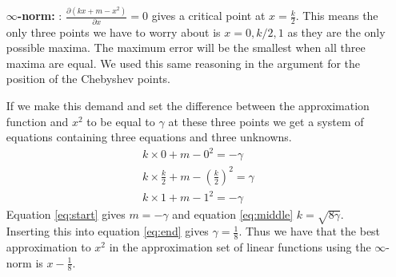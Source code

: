 \begin{solution}
\begin{enumerate}
  \item [{\bf $\infty$-norm: }]:
    $\frac{\partial (kx + m - x^2)}{\partial x} = 0$ gives a critical
    point at $x = \frac{k}{2}$. This means the only three points we
    have to worry about is $x = 0, k/2, 1$ as they are the only
    possible maxima. The maximum error will be the smallest when all
    three maxima are equal. We used this same reasoning in the
    argument for the position of the Chebyshev points.

    If we make this demand and set the difference between the
    approximation function and $x^2$ to be equal to $\gamma$ at these
    three points we get a system of equations containing three
    equations and three unknowns.
    \begin{align}
      k \times 0  + m  - 0^2  = -\gamma \label{eq:start}\\
      k \times \frac{k}{2}  + m - \left(\frac{k}{2}\right)^2  = \gamma
      \label{eq:middle}\\
      k \times 1  + m  - 1^2   = -\gamma \label{eq:end}
    \end{align}
    Equation \ref{eq:start} gives $m = - \gamma$ and equation
    \ref{eq:middle} $k = \sqrt{8\gamma}$. Inserting this into equation
    \ref{eq:end} gives $\gamma = \frac{1}{8}$. Thus we have that the
    best approximation to $x^2$ in the approximation set of linear
    functions using the $\infty$-norm is $x - \frac{1}{8}$.

\end{enumerate}
\end{solution}

 	

